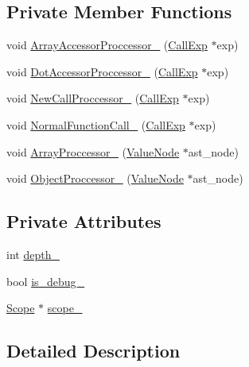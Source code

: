 \subsection*{Private Member Functions}
\begin{DoxyCompactItemize}
\item 
void \hyperlink{classmocha_1_1_optimizer_visitor_a8f79d8df35580aeda0436925cab1263e}{ArrayAccessorProccessor\_\-} (\hyperlink{classmocha_1_1_call_exp}{CallExp} $\ast$exp)
\item 
void \hyperlink{classmocha_1_1_optimizer_visitor_af7e7cd764aeba54ad8d3b7646a9a09d3}{DotAccessorProccessor\_\-} (\hyperlink{classmocha_1_1_call_exp}{CallExp} $\ast$exp)
\item 
void \hyperlink{classmocha_1_1_optimizer_visitor_a2d4b1e6dbc17883cd7c8feeb52deef00}{NewCallProccessor\_\-} (\hyperlink{classmocha_1_1_call_exp}{CallExp} $\ast$exp)
\item 
void \hyperlink{classmocha_1_1_optimizer_visitor_a9b70d6b1cef7891aaac7f9a389fceaf8}{NormalFunctionCall\_\-} (\hyperlink{classmocha_1_1_call_exp}{CallExp} $\ast$exp)
\item 
void \hyperlink{classmocha_1_1_optimizer_visitor_acf2c60025cfada79112b49322672e826}{ArrayProccessor\_\-} (\hyperlink{classmocha_1_1_value_node}{ValueNode} $\ast$ast\_\-node)
\item 
void \hyperlink{classmocha_1_1_optimizer_visitor_aa05dec816019992dd466f2a8f7a448d7}{ObjectProccessor\_\-} (\hyperlink{classmocha_1_1_value_node}{ValueNode} $\ast$ast\_\-node)
\end{DoxyCompactItemize}
\subsection*{Private Attributes}
\begin{DoxyCompactItemize}
\item 
int \hyperlink{classmocha_1_1_optimizer_visitor_ad3c8170c13dfffabbb8fd410bf809752}{depth\_\-}
\item 
bool \hyperlink{classmocha_1_1_optimizer_visitor_a8c6d531d8191fd265dcd090c88276fc1}{is\_\-debug\_\-}
\item 
\hyperlink{classmocha_1_1_scope}{Scope} $\ast$ \hyperlink{classmocha_1_1_optimizer_visitor_a5d5dc3088bc84c4ca0764533cfa8691e}{scope\_\-}
\end{DoxyCompactItemize}


\subsection{Detailed Description}


